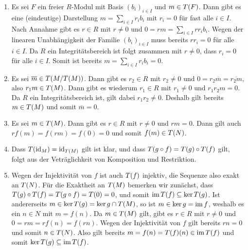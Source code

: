 \begin{solution}
\begin{enumerate}
    \item
      Es sei $F$ ein freier $R$-Modul mit Basis $(b_i)_{i \in I}$ und $m \in T(F)$.
      Dann gibt es eine (eindeutige) Darstellung $m = \sum_{i \in I} r_i b_i$ mit $r_i = 0$ für fast alle $i \in I$.
      Nach Annahme gibt es $r \in R$ mit $r \neq 0$ und $0 = rm = \sum_{i \in I} r r_i b_i$.
      Wegen der linearen Unabhängigkeit der Familie $(b_i)_{i \in I}$ muss bereits $r r_i = 0$ für alle $i \in I$.
      Da $R$ ein Integritätsbereich ist folgt zusammen mit $r \neq 0$, dass $r_i = 0$ für alle $i \in I$.
      Somit ist bereits $m = \sum_{i \in I} r_i b_i = 0$.
      
    \item
      Es sei $\overline{m} \in T(M/T(M))$.
      Dann gibt es $r_2 \in R$ mit $r_2 \neq 0$ und $0 = r_2 \overline{m} = \overline{r_2 m}$, also $r_1 m \in T(M)$.
      Dann gibt es wiederum $r_1 \in R$ mit $r_1 \neq 0$ und $r_1 r_2 m = 0$. 
      Da $R$ ein Integritätsbereich ist, gilt dabei $r_1 r_2 \neq 0$.
      Deshalb gilt bereits $m \in T(M)$ und somit $\overline{m} = 0$.
      
    \item
      Es sei $m \in T(M)$.
      Dann gibt es $r \in R$ mit $r \neq 0$ und $rm = 0$.
      Dann gilt auch $r f(m) = f(rm) = f(0) = 0$ und somit $f(m) \in T(N)$.
    
    \item
      Dass $T(\operatorname{id}_M) = \operatorname{id}_{T(M)}$ gilt ist klar, und dass $T(g \circ f) = T(g) \circ T(f)$ gilt, folgt aus der Veträglichkeit von Komposition und Restriktion.
    
    \item
      Wegen der Injektivität von $f$ ist auch $T(f)$ injektiv, die Sequenze also exakt an $T(N)$.
      Für die Exaktheit an $T(M)$ bemerken wir zunächst, dass $T(g) \circ T(f) = T(g \circ f) = T(0) = 0$, und somit $\operatorname{im} T(f) \subseteq \ker T(g)$.
      Ist andererseits $m \in \ker T(g) = \ker g \cap T(M)$, so ist $m \in \ker g = \operatorname{im} f$, weshalb es ein $n \in N$ mit $m = f(n)$.
      Da $m \in T(M)$ gilt, gibt es $r \in R$ mit $r \neq 0$ und $0 = rm = r f(n) = f(rn)$.
      Wegen der Injektivität von $f$ gilt bereits $rn = 0$ und somit $n \in T(N)$.
      Also gilt bereits $m = f(n) = T(f)(n) \in \operatorname{im} T(f)$ und somit $\ker T(g) \subseteq \operatorname{im} T(f)$.
    

\end{enumerate}
\end{solution}

